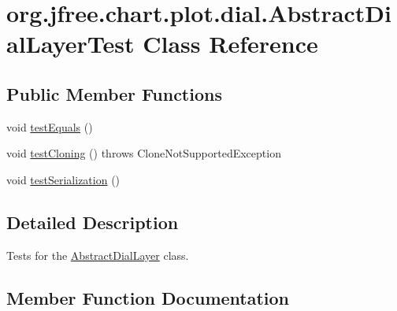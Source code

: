 \hypertarget{classorg_1_1jfree_1_1chart_1_1plot_1_1dial_1_1_abstract_dial_layer_test}{}\section{org.\+jfree.\+chart.\+plot.\+dial.\+Abstract\+Dial\+Layer\+Test Class Reference}
\label{classorg_1_1jfree_1_1chart_1_1plot_1_1dial_1_1_abstract_dial_layer_test}
\subsection*{Public Member Functions}
\begin{DoxyCompactItemize}
\item 
void \mbox{\hyperlink{classorg_1_1jfree_1_1chart_1_1plot_1_1dial_1_1_abstract_dial_layer_test_ab48f96dfd515cdd7dec5fa798b74dd18}{test\+Equals}} ()
\item 
void \mbox{\hyperlink{classorg_1_1jfree_1_1chart_1_1plot_1_1dial_1_1_abstract_dial_layer_test_a97158fb78ad8278514d527990a2bb8e7}{test\+Cloning}} ()  throws Clone\+Not\+Supported\+Exception 
\item 
void \mbox{\hyperlink{classorg_1_1jfree_1_1chart_1_1plot_1_1dial_1_1_abstract_dial_layer_test_af3a6ff35889f53bb87de068f186fbfd8}{test\+Serialization}} ()
\end{DoxyCompactItemize}


\subsection{Detailed Description}
Tests for the \mbox{\hyperlink{classorg_1_1jfree_1_1chart_1_1plot_1_1dial_1_1_abstract_dial_layer}{Abstract\+Dial\+Layer}} class. 

\subsection{Member Function Documentation}
\mbox{\label{classorg_1_1jfree_1_1chart_1_1plot_1_1dial_1_1_abstract_dial_layer_test_a97158fb78ad8278514d527990a2bb8e7}} 
